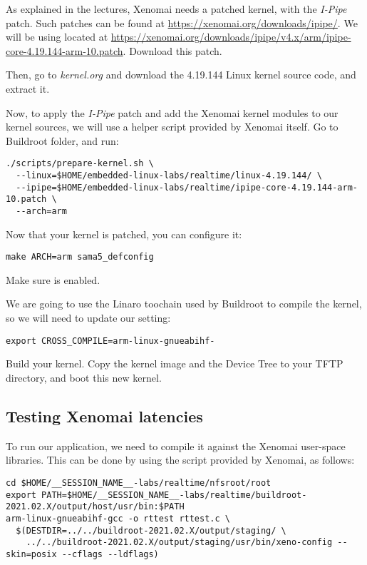As explained in the lectures, Xenomai needs a patched kernel, with the
{\em I-Pipe} patch. Such patches can be found at
\url{https://xenomai.org/downloads/ipipe/}. We will be using
 located at
\url{https://xenomai.org/downloads/ipipe/v4.x/arm/ipipe-core-4.19.144-arm-10.patch}. Download
this patch.

Then, go to {\em kernel.org} and download the 4.19.144 Linux kernel
source code, and extract it.

Now, to apply the {\em I-Pipe} patch and add the Xenomai kernel
modules to our kernel sources, we will use a helper script provided by
Xenomai itself. Go to Buildroot 
folder, and run:

\begin{verbatim}
./scripts/prepare-kernel.sh \
  --linux=$HOME/embedded-linux-labs/realtime/linux-4.19.144/ \
  --ipipe=$HOME/embedded-linux-labs/realtime/ipipe-core-4.19.144-arm-10.patch \
  --arch=arm
\end{verbatim}

Now that your kernel is patched, you can configure it:

\begin{verbatim}
make ARCH=arm sama5_defconfig
\end{verbatim}

Make sure  is enabled.

We are going to use the Linaro toochain used by Buildroot to compile the
kernel, so we will need to update our  setting:

\begin{verbatim}
export CROSS_COMPILE=arm-linux-gnueabihf-
\end{verbatim}

Build your kernel. Copy the kernel image and the Device Tree to your TFTP
directory, and boot this new kernel.

\subsection{Testing Xenomai latencies}

To run our  application, we need to compile it against
the Xenomai user-space libraries. This can be done by using the
 script provided by Xenomai, as follows:

\small
\begin{verbatim}
cd $HOME/__SESSION_NAME__-labs/realtime/nfsroot/root
export PATH=$HOME/__SESSION_NAME__-labs/realtime/buildroot-2021.02.X/output/host/usr/bin:$PATH
arm-linux-gnueabihf-gcc -o rttest rttest.c \
  $(DESTDIR=../../buildroot-2021.02.X/output/staging/ \
    ../../buildroot-2021.02.X/output/staging/usr/bin/xeno-config --skin=posix --cflags --ldflags)
\end{verbatim}
\normalsize

